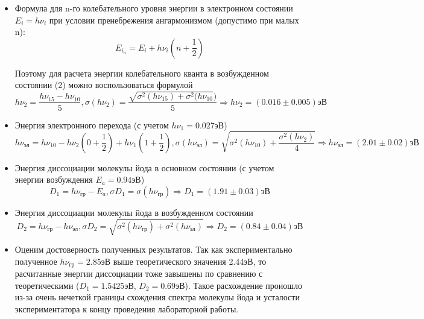 \documentclass[a4paper,12pt]{article} %
\begin{document}
\begin{itemize}
\item 
Формула для n-го колебательного уровня энергии в электронном состоянии $E_i = h \nu_i$ при условии пренебрежения ангармонизмом (допустимо при малых n):
\begin{equation*}
    E_{i_n} = E_i + h \nu_i (n + \frac{1}{2})
\end{equation*}

Поэтому для расчета энергии колебательного кванта в возбужденном состоянии (2) можно воспользоваться формулой
\begin{equation*}
    h\nu_2 = \frac{h\nu_{15} - h\nu_{10}}{5}, \sigma (h\nu_2) = \frac{\sqrt{\sigma^2 (h\nu_{15}) + \sigma^2 (h\nu_{10}})}{5} \Rightarrow \boxed{h\nu_2 = (0.016 \pm 0.005) \text{эВ}}
\end{equation*}

\item 
Энергия электронного перехода (с учетом $h\nu_1 = 0.027\text{эВ}$)
\begin{equation*}
    h\nu_{\text{эл}} = h \nu_{10} - h \nu_{2} (0 + \frac{1}{2}) + h \nu_{1} (1 + \frac{1}{2}), \sigma( h\nu_{\text{эл}}) = \sqrt{\sigma^2 (h\nu_{10}) + \frac{\sigma^2 (h\nu_{2})}{4} } \Rightarrow \boxed {h\nu_{\text{эл}} = (2.01 \pm 0.02) \text{эВ}}
\end{equation*}

\item Энергия диссоциации молекулы йода в основном состоянии (с учетом энергии возбуждения $E_a = 0.94$эВ)
\begin{equation*}
    D_1 = h \nu_{\text{гр}} - E_a, \sigma D_1 = \sigma (h \nu_{\text{гр}}) \Rightarrow \boxed{D_1 = (1.91 \pm 0.03) \text{эВ}}
\end{equation*}


\item Энергия диссоциации молекулы йода в возбужденном состоянии
\begin{equation*}
    D_2 = h\nu_{\text{гр}} - h\nu_{\text{эл}}, \sigma D_2 = \sqrt{\sigma^2 ({h\nu_{\text{гр}}}) + \sigma^2 (h\nu_{\text{эл}})} \Rightarrow \boxed{ D_2 = (0.84 \pm 0.04) \text{эВ}}
\end{equation*}
\item Оценим достоверность полученных результатов. Так как экспериментально полученное $h\nu_{\text{гр}} = 2.85$эВ выше теоретического значения 2.44эВ, то  расчитанные энергии диссоциации тоже завышены по сравнению с теоретическими ($D_1 = 1.5425$эВ, $D_2 = 0.69$эВ). Такое расхождение проиошло из-за очень нечеткой границы схождения спектра молекулы йода и усталости экспериментатора к концу проведения лабораторной работы. 


\end{itemize}
\end{document}
